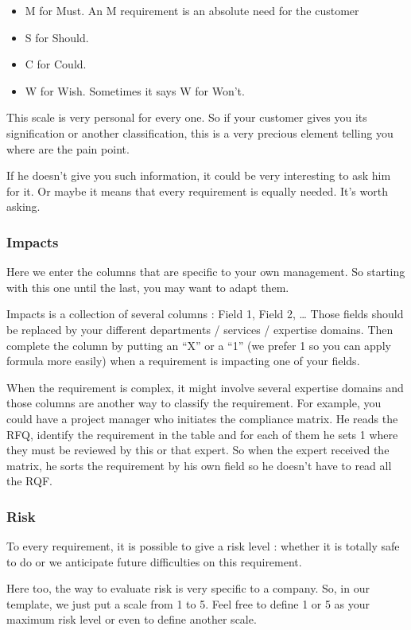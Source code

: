 \begin{itemize}
    \item M for Must. An M requirement is an absolute need for the customer
    \item S for Should.
    \item C for Could.
    \item W for Wish. Sometimes it says W for Won’t.
\end{itemize}

This scale is very personal for every one. So if your customer gives you its signification or another classification, this is a very precious element telling you where are the pain point.

If he doesn’t give you such information, it could be very interesting to ask him for it. Or maybe it means that every requirement is equally needed. It’s worth asking.

\subsubsection{Impacts}
Here we enter the columns that are specific to your own management. So starting with this one until the last, you may want to adapt them.

Impacts is a collection of several columns : Field 1, Field 2, … Those fields should be replaced by your different departments / services / expertise domains. Then complete the column by putting an “X” or a “1” (we prefer 1 so you can apply formula more easily) when a requirement is impacting one of your fields.

When the requirement is complex, it might involve several expertise domains and those columns are another way to classify the requirement. For example, you could have a project manager who initiates the compliance matrix. He reads the RFQ, identify the requirement in the table and for each of them he sets 1 where they must be reviewed by this or that expert. So when the expert received the matrix, he sorts the requirement by his own field so he doesn’t have to read all the RQF.

\subsubsection{Risk}
To every requirement, it is possible to give a risk level : whether it is totally safe to do or we anticipate future difficulties on this requirement.

Here too, the way to evaluate risk is very specific to a company. So, in our template, we just put a scale from 1 to 5. Feel free to define 1 or 5 as your maximum risk level or even to define another scale.

